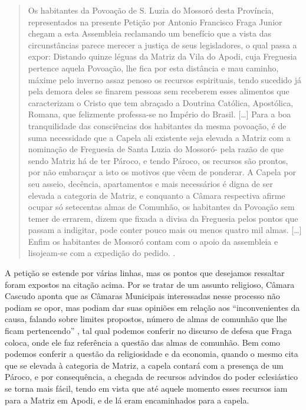 \begin{refsection}
    \begin{quotation}
        Os habitantes da Povoação de S. Luzia do Mossoró desta Província, representados na presente Petição por Antonio Francisco Fraga Junior chegam a esta Assembleia reclamando um benefício que a vista das circunstâncias parece merecer a justiça de seus legisladores, o qual passa a expor: Distando quinze léguas da Matriz da Vila do Apodi, cuja Freguesia pertence aquela Povoação, lhe fica por esta distância e mau caminho, máxime pelo inverno assaz penoso os recursos espirituais, tendo sucedido já pela demora deles se finarem pessoas sem receberem esses alimentos que caracterizam o Cristo que tem abraçado a Doutrina Católica, Apostólica, Romana, que felizmente professa-se no Império do Brasil. [\dots] Para a boa tranquilidade das consciências dos habitantes da mesma povoação, é de suma necessidade que a Capela ali existente seja elevada a Matriz com a nominação de Freguesia de Santa Luzia do Mossoró- pela razão de que sendo Matriz há de ter Pároco, e tendo Pároco, os recursos são prontos, por não embaraçar a isto os motivos que vêem de ponderar. A Capela por seu asseio, decência, apartamentos e mais necessários é digna de ser elevada a categoria de Matriz, e conquanto a Câmara respectiva afirme ocupar só setecentas almas de Comunhão, os habitantes da Povoação sem temer de errarem, dizem que fixada a divisa da Freguesia pelos pontos que passam a indigitar, pode conter pouco mais ou menos quatro mil almas. [\dots] Enfim os habitantes de Mossoró contam com o apoio da assembleia e lisojeam-se com a expedição do pedido. \cite[p.~51--52]{Cascudo2010Notas}.
    \end{quotation}

    A petição se estende por várias linhas, mas os pontos que desejamos ressaltar foram expostos na citação acima. Por se tratar de um assunto religioso, Câmara Cascudo aponta que as Câmaras Municipais interessadas nesse processo não podiam se opor, mas podiam dar suas opiniões em relação aos ``inconvenientes da causa, falando sobre limites propostos, número de almas de comunhão que lhe ficam pertencendo'' \cite[p.~50]{Cascudo2010Notas}, tal qual podemos conferir no discurso de defesa que Fraga coloca, onde ele faz referência a questão das almas de comunhão. Bem como podemos conferir a questão da religiosidade e da economia, quando o mesmo cita que se elevada à categoria de Matriz, a capela contará com a presença de um Pároco, e por consequência, a chegada de recursos advindos do poder eclesiástico se torna mais fácil, tendo em vista que até aquele momento esses recursos iam para a Matriz em Apodi, e de lá eram encaminhados para a capela. 


\end{refsection}
